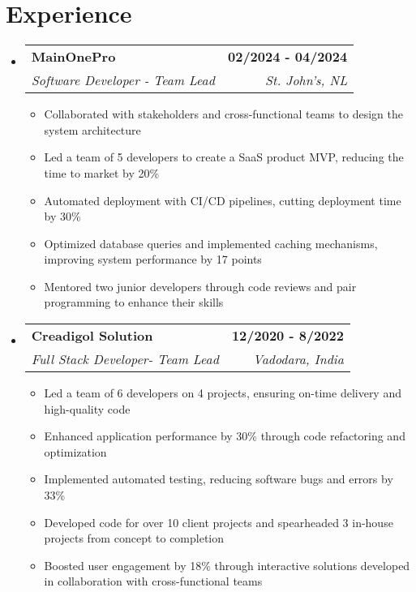 \documentclass[letterpaper,11pt]{article}
\makeatletter
\newcommand{\resumeItem}[1]{
  \item\small{
    {#1 \vspace{-2pt}}
  }
}
\newcommand{\resumeSubheading}[4]{
  \vspace{-2pt}\item
    \begin{tabular*}{1.0\textwidth}[t]{l@{\extracolsep{\fill}}r}
      \textbf{#1} & \textbf{\small #2} \\
      \textit{\small#3} & \textit{\small #4} \\
    \end{tabular*}\vspace{-7pt}
}
\newcommand{\resumeSubHeadingListStart}{\begin{itemize}[leftmargin=0.0in, label={}]}
\newcommand{\resumeSubHeadingListEnd}{\end{itemize}}
\newcommand{\resumeItemListStart}{\begin{itemize}}
\newcommand{\resumeItemListEnd}{\end{itemize}\vspace{-5pt}}
\makeatother
\begin{document}
\section{Experience}
  \resumeSubHeadingListStart
    \resumeSubheading
      {MainOnePro}{02/2024 - 04/2024}
      {Software Developer - Team Lead}{St. John's, NL}
      \resumeItemListStart
        \resumeItem{Collaborated with stakeholders and cross-functional teams to design the system architecture}
        \resumeItem{Led a team of 5 developers to create a SaaS product MVP, reducing the time to market by 20\%}
        \resumeItem{Automated deployment with CI/CD pipelines, cutting deployment time by 30\%}
        \resumeItem{Optimized database queries and implemented caching mechanisms, improving system performance by 17 points}
        \resumeItem{Mentored two junior developers through code reviews and pair programming to enhance their skills}
      \resumeItemListEnd
    \resumeSubheading
      {Creadigol Solution}{12/2020 - 8/2022}
      {Full Stack Developer- Team Lead}{Vadodara, India}
      \resumeItemListStart
        \resumeItem{Led a team of 6 developers on 4 projects, ensuring on-time delivery and high-quality code}
        \resumeItem{Enhanced application performance by 30\% through code refactoring and optimization}
        \resumeItem{Implemented automated testing, reducing software bugs and errors by 33\%}
        \resumeItem{Developed code for over 10 client projects and spearheaded 3 in-house projects from concept to completion}
        \resumeItem{Boosted user engagement by 18\% through interactive solutions developed in collaboration with cross-functional teams}
      \resumeItemListEnd
  \resumeSubHeadingListEnd
\vspace{-16pt}
\end{document}
